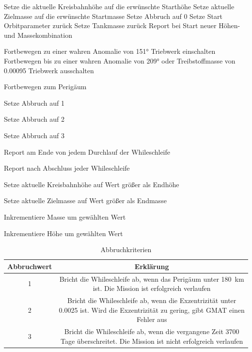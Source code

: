 \newpage
\begin{algorithmic}

\STATE Setze die aktuelle Kreisbahnhöhe auf die erwünschte Starthöhe
\STATE Setze aktuelle Zielmasse auf die erwünschte Startmasse
\STATE Setze Abbruch auf 0
\STATE Setze Start Orbitparameter zurück
\STATE Setze Tankmasse zurück
\RETURN Report bei Start neuer Höhen- und Massekombination


\STATE Fortbewegen zu einer wahren Anomalie von 151°
\STATE Triebwerk einschalten
\STATE Fortbewegen bis zu einer wahren Anomalie von 209° oder Treibstoffmasse von 0.00095 
\STATE Triebwerk ausschalten
\ENDIF

\STATE Fortbewegen zum Perigäum
\ENDIF

\STATE Setze Abbruch auf 1
\ENDIF

\STATE Setze Abbruch auf 2
\ENDIF

\STATE Setze Abbruch auf 3
\ENDIF

\RETURN Report am Ende von jedem Durchlauf der Whileschleife
\ENDWHILE

\RETURN Report nach Abschluss jeder Whileschleife


\STATE Setze aktuelle Kreisbahnhöhe auf Wert größer als Endhöhe 
\ENDIF

\STATE Setze aktuelle Zielmasse auf Wert größer als Endmasse
\ENDIF

\STATE Inkrementiere Masse um gewählten Wert
\ENDWHILE

\STATE Inkrementiere Höhe um gewählten Wert
\ENDWHILE


\end{algorithmic}
\newpage


\begin{center}
\begin{table}
\begin{tabular}{c| c{5cm}}
Abbruchwert & Erklärung \\
\hline \hline
\num{1} &  \multicolumn{2}{p{12cm}}{ Bricht die Whileschleife ab, wenn das Perigäum unter \SI{180}{\km} ist. Die Mission ist erfolgreich verlaufen}\\ \hline
\num{2} &  \multicolumn{2}{p{12cm}}{ Bricht die Whileschleife ab, wenn die Exzentrizität unter \num{0.0025} ist. Wird die Exzentrizität zu gering, gibt GMAT einen Fehler aus}\\  \hline
\num{3} &  \multicolumn{2}{p{12cm}}{ Bricht die Whileschleife ab, wenn die vergangene Zeit \num{3700} Tage überschreitet. Die Mission ist nicht erfolgreich verlaufen}\\  
\end{tabular}
\caption{Abbruchkriterien}
\label{Abbruchkrit}
\end{table}
\end{center}

